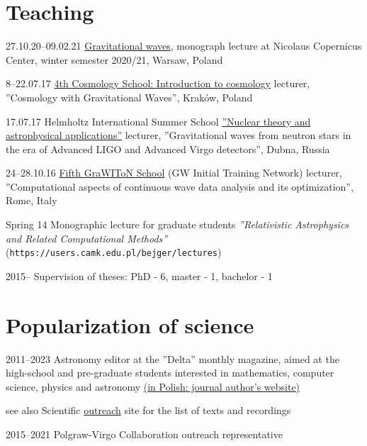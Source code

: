 \documentclass[]{friggeri-cv} %
\begin{document}
\section{Teaching}
\begin{entrylistshort}

\entrys
{27.10.20--09.02.21} 
{\href{https://users.camk.edu.pl/bejger/gw-lecture2020}{Gravitational waves}, monograph lecture at Nicolaus Copernicus Center, winter semester 2020/21, Warsaw, Poland} 

\entrys
{8--22.07.17}
{\href{http://cosmoschool2018.oa.uj.edu.pl}{4th Cosmology School: Introduction to cosmology} lecturer, ''Cosmology with Gravitational Waves'', Kraków, Poland}

\entrys
{17.07.17} 
{Helmholtz International Summer School \href{http://theor.jinr.ru/~ntaa/17}{''Nuclear theory and astrophysical applications''} lecturer, ''Gravitational waves from neutron stars in the era of Advanced LIGO and Advanced Virgo detectors'', Dubna, Russia}  

\entrys
{24--28.10.16}
{\href{https://events.ego-gw.it/indico/conferenceDisplay.py?ovw=True\&confId=44}{Fifth GraWIToN School} (GW Initial Training Network) lecturer, ''Computational aspects of continuous wave data analysis and its optimization'', Rome, Italy}

\entrys
{Spring 14}
{Monographic lecture for graduate students {\it ''Relativistic Astrophysics and Related Computational Methods''} ({\tt https://users.camk.edu.pl/bejger/lectures})} 


\entrys
{2015--} 
{Supervision of theses: PhD - 6, master - 1, bachelor - 1} 
\end{entrylistshort}



\section{Popularization of science}
\begin{entrylistshort}

\entrys 
{2011--2023} 
{Astronomy editor at the ''Delta'' monthly magazine, aimed at the high-school and pre-graduate students interested in mathematics, computer science, physics and astronomy \href{http://www.deltami.edu.pl/delta/autorzy/michal\_bejger}{(in Polish: journal author's website)}} 

\entrys
{see also} 
{Scientific \href{http://users.camk.edu.pl/bejger/outreach/}{outreach} site for the list of texts and recordings} 

\entrys
{2015--2021} 
{Polgraw-Virgo Collaboration outreach representative} 
\end{entrylistshort}
\end{document}
